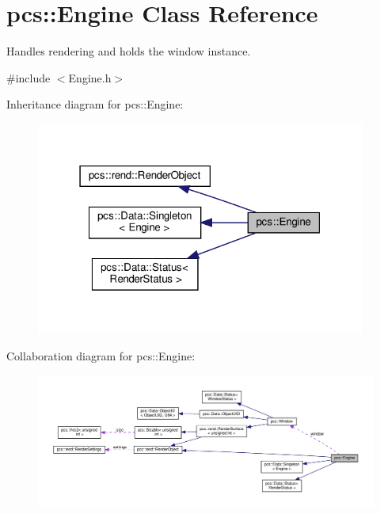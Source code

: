 \hypertarget{classpcs_1_1Engine}{}\section{pcs\+:\+:Engine Class Reference}
\label{classpcs_1_1Engine}


Handles rendering and holds the window instance.  




{\ttfamily \#include $<$Engine.\+h$>$}



Inheritance diagram for pcs\+:\+:Engine\+:\nopagebreak
\begin{figure}[H]
\begin{center}
\leavevmode
\includegraphics[width=307pt]{classpcs_1_1Engine__inherit__graph}
\end{center}
\end{figure}


Collaboration diagram for pcs\+:\+:Engine\+:
\nopagebreak
\begin{figure}[H]
\begin{center}
\leavevmode
\includegraphics[width=350pt]{classpcs_1_1Engine__coll__graph}
\end{center}
\end{figure}
